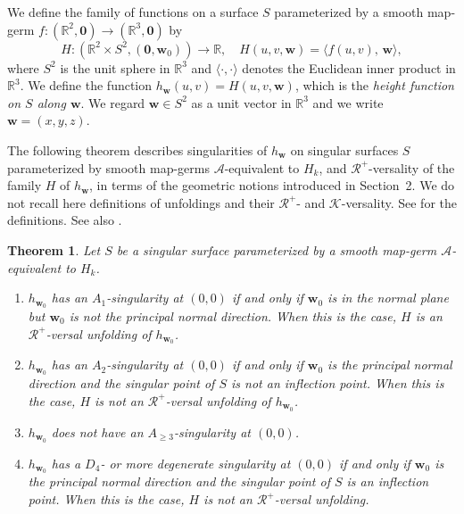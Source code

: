 \documentclass[12pt]{amsart}
\theoremstyle{plain}
\newtheorem{theorem}{Theorem}[section]
\theoremstyle{definition}
\newcommand{\R}{\mathbb{R}}
\renewcommand{\geq}{\geqslant}
\begin{document}
We define the family of functions on a surface $S$ parameterized by a smooth map-germ $f:(\R^2,\bm{0})\to(\R^3,\bm{0})$ by
\[
H:(\R^2 \times S^2,(\bm{0}, \bm{w}_0))\to \R, \quad H(u,v,\bm{w}) = \langle f(u,v),\,\bm{w} \rangle,
\]
where $S^2$ is the unit sphere in $\R^3$ and $\langle\cdot, \cdot \rangle$ denotes the Euclidean inner product in $\R^3$. 
We define the function $h_{\bm{w}}(u,v) = H(u,v,\bm{w})$, which is the {\it height function on $S$ along  $\bm{w}$}.
We regard $\bm{w} \in S^2$ as a unit vector in $\R^3$ and we write
$\bm{w} = (x,y,z)$.

The following theorem describes singularities of $h_{\bm{w}}$ on singular surfaces $S$ parameterized by smooth map-germs $\mathcal{A}$-equivalent to $H_k$, and $\mathcal{R}^+$-versality of the family $H$ of $h_{\bm{w}}$, in terms of the geometric notions introduced in Section~2. 
We do not recall here definitions of unfoldings and their $\mathcal{R}^+$- and $\mathcal{K}$-versality. 
See \cite{Arnold1986} for the definitions.
See also \cite{IRRT2015, Martinet1982, Wall1981}.

\begin{theorem}
\label{thm:height}
Let $S$ be a singular surface parameterized by a smooth map-germ $\mathcal{A}$-equivalent to $H_k$.
\begin{enumerate}
\item 
$h_{\bm{w}_0}$ has an $A_1$-singularity at $(0,0)$ if and only if $\bm{w}_0$ is in the normal plane but $\bm{w}_0$ is not the principal normal direction. 
When this is the case, $H$ is an $\mathcal{R}^+$-versal unfolding of $h_{\bm{w}_0}$. 

\item 
$h_{\bm{w}_0}$ has an $A_2$-singularity at $(0,0)$ if and only if $\bm{w}_0$ is the principal normal direction and the singular point of $S$ is not an inflection point. 
When this is the case, $H$ is not an $\mathcal{R}^+$-versal unfolding of $h_{\bm{w}_0}$. 

\item 
$h_{\bm{w}_0}$ does not have an $A_{\geq 3}$-singularity at $(0,0)$.

\item 
$h_{\bm{w}_0}$ has a $D_4$- or more degenerate singularity at $(0,0)$ if and only if $\bm{w}_0$ is the principal normal direction and the singular point of $S$ is an inflection point. 
When this is the case, $H$ is not an $\mathcal{R}^+$-versal unfolding.
\end{enumerate}
\end{theorem}
\end{document}
